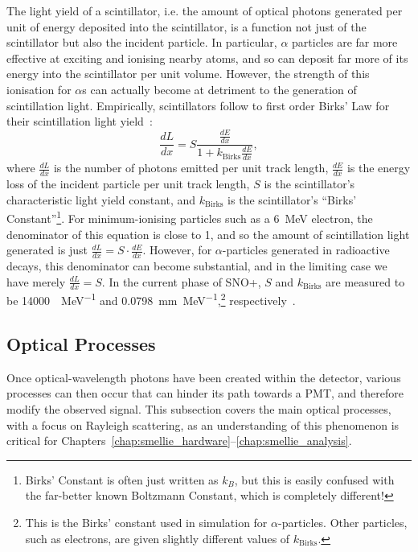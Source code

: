 The light yield of a scintillator, i.e. the amount of optical photons generated per unit of energy deposited into the scintillator, is a function not just of the scintillator but also the incident particle. In particular, $\alpha$ particles are far more effective at exciting and ionising nearby atoms, and so can deposit far more of its energy into the scintillator per unit volume. However, the strength of this ionisation for $\alpha$s can actually become at detriment to the generation of scintillation light. Empirically, scintillators follow to first order Birks' Law for their scintillation light yield~\cite{}: %
\begin{equation}
    \frac{dL}{dx} = S\frac{\frac{dE}{dx}}{1+k_{\mathrm{Birks}}\frac{dE}{dx}},
\end{equation}
where $\frac{dL}{dx}$ is the number of photons emitted per unit track length, $\frac{dE}{dx}$ is the energy loss of the incident particle per unit track length, $S$ is the scintillator's characteristic light yield constant, and $k_{\mathrm{Birks}}$ is the scintillator's ``Birks' Constant''\footnote{Birks' Constant is often just written as $k_{B}$, but this is easily confused with the far-better known Boltzmann Constant, which is completely different!}. 
For minimum-ionising particles such as a \SI{6}{\MeV} electron, the denominator of this equation is close to 1, and so the amount of scintillation light generated is just $\frac{dL}{dx} = S\cdot\frac{dE}{dx}$. However, for $\alpha$-particles generated in radioactive decays, this denominator can become substantial, and in the limiting case we have merely $\frac{dL}{dx} = S$. In the current phase of SNO+, $S$ and $k_{\mathrm{Birks}}$ are measured to be \SI{14000}{\gamma\per\MeV} and \SI{0.0798}{\mm\per\MeV},\footnote{This is the Birks' constant used in simulation for $\alpha$-particles. Other particles, such as electrons, are given slightly different values of $k_{\mathrm{Birks}}$.}
 respectively~\cite{}. %

 \subsection{Optical Processes}\label{sec:optical_processes}
 Once optical-wavelength photons have been created within the detector, various processes can then occur that can hinder its path towards a PMT, and therefore modify the observed signal. This subsection covers the main optical processes, with a focus on Rayleigh scattering, as an understanding of this phenomenon is critical for Chapters~\ref{chap:smellie_hardware}--\ref{chap:smellie_analysis}.
